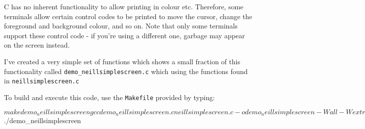 C has no inherent functionality to allow printing in colour etc.
Therefore, some terminals allow certain control codes to be printed
to move the cursor, change the foreground and background colour, and
so on.
Note that only some terminals support these control code - if you're
using a different one, garbage may appear on the screen instead.

I've created a very simple set of functions which shows a small
fraction of this functionality called \verb^demo_neillsimplescreen.c^
which using the functions found in \verb^neillsimplescreen.c^

To build and execute this code, use the \verb^Makefile^ provided by typing:
\begin{terminaloutput}
$ make demo_neillsimplescreen
gcc demo_neillsimplescreen.c neillsimplescreen.c
-o demo_neillsimplescreen -Wall -Wextra -pedantic 
-std=c99 -Wvla -g3 -fsanitize=undefined -fsanitize=address -lm
$ ./demo_neillsimplescreen 
\end{terminaloutput}
